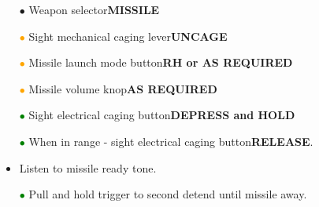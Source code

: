 \documentclass[a4paper,12pt,dvipsnames]{letter}
\newcommand{\button}[1]{\textbf{#1}}
\newcommand{\bi}{\textcolor{ProcessBlue}{$\bullet$\;}}
\newcommand{\gi}{\textcolor{Green}{$\bullet$\;}}
\newcommand{\oi}{\textcolor{Orange}{$\bullet$\;}}
\begin{document}
{\begin{itemize}
 \item[\bi] Weapon selector\dotfill\button{MISSILE}
 \item[\oi] Sight mechanical caging lever\dotfill\button{UNCAGE}
 \item[\oi] Missile launch mode button\dotfill\button{RH or AS REQUIRED}
 \item[\oi] Missile volume knop\dotfill\button{AS REQUIRED}
 \item[\gi] Sight electrical caging button\dotfill\button{DEPRESS and HOLD}
 \item[\gi] When in range - sight electrical caging button\dotfill\button{RELEASE}.
 \item Listen to missile ready tone.
 \item[\gi] Pull and hold trigger to second detend until missile away.
\end{itemize}
}
\end{document}

